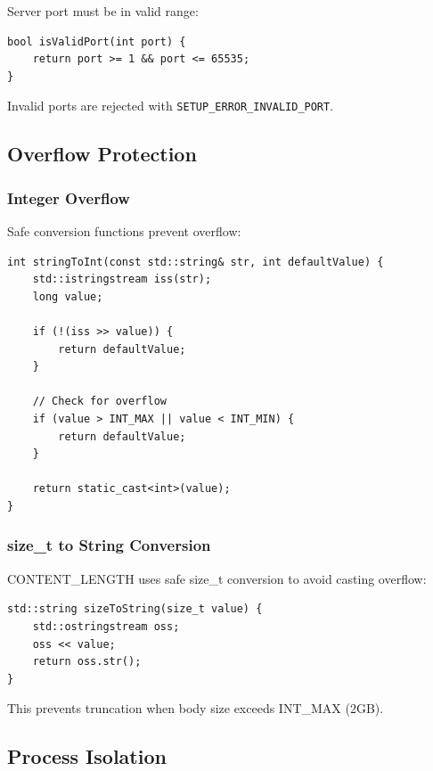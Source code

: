\documentclass[11pt,a4paper]{article}
\begin{document}
Server port must be in valid range:

\begin{lstlisting}[caption=Port Validation]
bool isValidPort(int port) {
    return port >= 1 && port <= 65535;
}
\end{lstlisting}

Invalid ports are rejected with \texttt{SETUP\_ERROR\_INVALID\_PORT}.

\subsection{Overflow Protection}

\subsubsection{Integer Overflow}

Safe conversion functions prevent overflow:

\begin{lstlisting}[caption=Safe Integer Conversion]
int stringToInt(const std::string& str, int defaultValue) {
    std::istringstream iss(str);
    long value;
    
    if (!(iss >> value)) {
        return defaultValue;
    }
    
    // Check for overflow
    if (value > INT_MAX || value < INT_MIN) {
        return defaultValue;
    }
    
    return static_cast<int>(value);
}
\end{lstlisting}

\subsubsection{size\_t to String Conversion}

CONTENT\_LENGTH uses safe size\_t conversion to avoid casting overflow:

\begin{lstlisting}[caption=Safe size\_t Conversion]
std::string sizeToString(size_t value) {
    std::ostringstream oss;
    oss << value;
    return oss.str();
}
\end{lstlisting}

This prevents truncation when body size exceeds INT\_MAX (2GB).

\subsection{Process Isolation}
\end{document}
